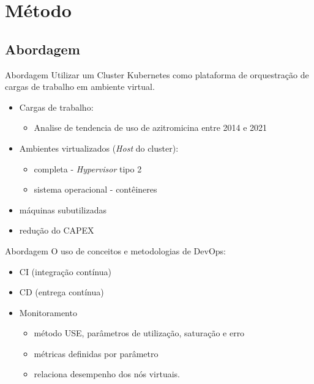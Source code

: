 \documentclass[10pt,brazil]{beamer}
\theoremstyle{definition}
\begin{document}
\section{Método}

\subsection{Abordagem}
\begin{frame}[allowframebreaks]{Abordagem}
  Utilizar um Cluster Kubernetes como plataforma de orquestração de cargas de trabalho em ambiente virtual.
  \begin{itemize}
    \item Cargas de trabalho:
          \begin{itemize}
            \item Analise de tendencia de uso de azitromicina entre 2014 e 2021
          \end{itemize}
        \item Ambientes virtualizados (\emph{Host} do cluster):
          \begin{itemize}
            \item completa - \emph{Hypervisor} tipo 2
            \item sistema operacional - contêineres
        \end{itemize}
    
        \item máquinas subutilizadas
        \item redução do CAPEX
    \end{itemize}
\end{frame}

\begin{frame}{Abordagem}
  O uso de conceitos e metodologias de DevOps:
  \begin{itemize}
            \item CI (integração contínua)
            \item CD (entrega contínua)
    \item Monitoramento
        \begin{itemize}
            \item método USE, parâmetros de utilização, saturação e erro 
            \item métricas definidas por parâmetro
            \item relaciona desempenho dos nós virtuais.
        \end{itemize}
  \end{itemize}
\end{frame}
\end{document}
